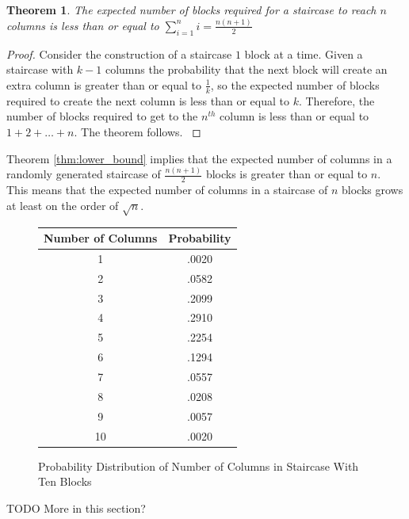 \documentclass[12pt]{amsart}
\newtheorem{theorem}{Theorem}[section]
\begin{document}
\begin{theorem}
\label{lower_bound}
The expected number of blocks required for a staircase to reach $n$ columns is less than or equal to $\displaystyle\sum_{i=1}^{n}i = \frac{n(n+1)}{2}$
\end{theorem}

\begin{proof}
Consider the construction of a staircase $1$ block at a time. Given a staircase with $k-1$ columns the probability that the next block will create an extra column is greater than or equal to $\frac{1}{k}$, so the expected number of blocks required to create the next column is less than or equal to $k$. Therefore, the number of blocks required to get to the $n^{th}$ column is less than or equal to $1 + 2 + \ldots + n$. The theorem follows.
\label{thm:lower_bound}
\end{proof}

Theorem \ref{thm:lower_bound} implies that the expected number of columns in a randomly generated staircase of $\frac{n(n+1)}{2}$ blocks is greater than or equal to $n$. This means that the expected number of columns in a staircase of $n$ blocks grows at least on the order of $\sqrt{n}$.





\begin{figure}
\caption{Probability Distribution of Number of Columns in Staircase With Ten Blocks}
\label{fig:prob_distribution}
\begin{center}
\begin{tabular}{| c | c |}
\hline
Number of Columns & Probability\\ \hline
1 & .0020\\ \hline
2 & .0582\\ \hline
3 & .2099\\ \hline
4 & .2910\\ \hline
5 & .2254\\ \hline
6 & .1294\\ \hline
7 & .0557\\ \hline
8 & .0208\\ \hline
9 & .0057\\ \hline
10 & .0020\\ \hline
\end{tabular}
\end{center}
\end{figure}
  





TODO More in this section?
\end{document}
